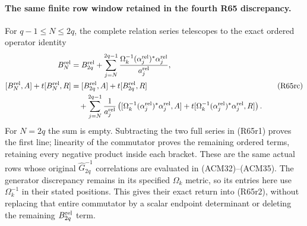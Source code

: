 \paragraph{The same finite row window retained in the fourth R65 discrepancy.}
For $q-1\leq N\leq2q$, the complete relation series telescopes to
the exact ordered operator identity
\[
\begin{aligned}
 B_N^{\rm rel}
 &=B_{2q}^{\rm rel}+
   \sum_{j=N}^{2q-1}\frac{\Omega_k^{-1}
             (\alpha_j^{\rm rel})^*\alpha_j^{\rm rel}}{a_j^{\rm rel}},\\
 [B_N^{\rm rel},A]+t[B_N^{\rm rel},R]
 &=[B_{2q}^{\rm rel},A]+t[B_{2q}^{\rm rel},R]\\
 &\quad+\sum_{j=N}^{2q-1}\frac1{a_j^{\rm rel}}
 \left([\Omega_k^{-1}(\alpha_j^{\rm rel})^*\alpha_j^{\rm rel},A]
       +t[\Omega_k^{-1}(\alpha_j^{\rm rel})^*\alpha_j^{\rm rel},R]
                                                        \right).
\end{aligned}\tag{R65rc}
\]
For $N=2q$ the sum is empty. Subtracting the two full series
in (R65r1) proves the first line; linearity of the commutator
proves the remaining ordered terms, retaining every negative
product inside each bracket. These are the same actual rows
whose original $\widehat G_{2q}^{-1}$ correlations are evaluated
in (ACM32)--(ACM35). The generator discrepancy remains in its
specified $\Omega_k$ metric, so its entries here use
$\Omega_k^{-1}$ in their stated positions. This gives their exact
return into (R65r2), without replacing that entire commutator
by a scalar endpoint determinant or deleting the remaining
$B_{2q}^{\rm rel}$ term.

